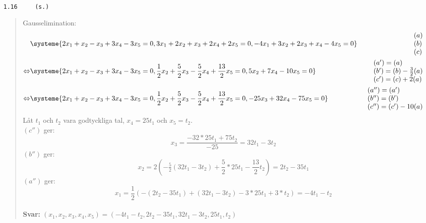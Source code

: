 \documentclass[a4paper]{article}
\newcommand{\tskcol}[1]{\textcolor{tskcol}{#1}}
\begin{document}
\texttt{\tskcol{1.16~~~~ (s.)}}
\begin{quotation}
	\noindent
	Gausselimination:
	\begin{align*}
	&\systeme{
		 2x_1+ x_2- x_3+3x_4-3x_5=0,
		 3x_1+2x_2+ x_3+2x_4+2x_5=0,
		-4x_1+3x_2+2x_3+ x_4-4x_5=0}  
	&\begin{array}{l} 
	(a) \\ 
	(b) \\
	(c)
	\end{array} \\ \Leftrightarrow
	&\systeme{
		 2x_1+           x_2-           x_3+          3x_4-           3x_5=0,
		      \frac{1}{2}x_2+\frac{5}{2}x_3-\frac{5}{2}x_4+\frac{13}{2}x_5=0,
		                5x_2               +          7x_4-          10x_5=0}  
	&\begin{array}{l} 
	(a')=(a) \\ 
	(b')=(b)-\frac{3}{2}(a) \\
	(c')=(c)+2(a)
	\end{array} \\ \Leftrightarrow
	&\systeme{
		2x_1+           x_2-           x_3+          3x_4-           3x_5=0,
		     \frac{1}{2}x_2+\frac{5}{2}x_3-\frac{5}{2}x_4+\frac{13}{2}x_5=0,
		                   -         25x_3+         32x_4-          75x_5=0}  
	&\begin{array}{l} 
	(a'')=(a') \\ 
	(b'')=(b') \\
	(c'')=(c')-10(a)
	\end{array} 
	\end{align*}
	Låt $t_1$ och $t_2$ vara godtyckliga tal, $x_4=25t_1$ och $x_5=t_2$. \\
	$(c'')$ ger:
	\[x_3=\frac{-32*25t_1+75t_2}{-25}=32t_1-3t_2\]
	$(b'')$ ger:
	\[x_2=2(-\tfrac{5}{2}(32t_1-3t_2)+\frac{5}{2}*25t_1-\frac{13}{2}t_2)=2t_2-35t_1\]
	$(a'')$ ger:
	\[x_1=\frac{1}{2}(-(2t_2-35t_1)+(32t_1-3t_2)-3*25t_1+3*t_2)=-4t_1-t_2\]
	\\
	\textbf{Svar:} $(x_1,x_2,x_3,x_4,x_5)=(-4t_1-t_2,2t_2-35t_1,32t_1-3t_2,25t_1,t_2)$
\end{quotation}
\end{document}
